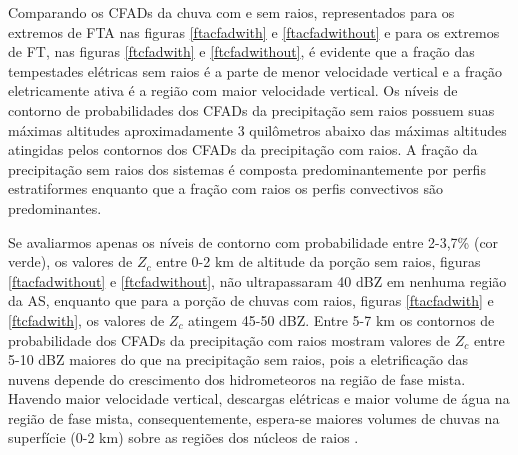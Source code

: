 Comparando os CFADs da chuva com e sem raios, representados para os extremos de FTA nas figuras \ref{ftacfadwith} e \ref{ftacfadwithout} e para os extremos de FT, nas figuras \ref{ftcfadwith} e \ref{ftcfadwithout}, é evidente que a fração das tempestades elétricas sem raios é a parte de menor velocidade vertical e a fração eletricamente ativa é a região com maior velocidade vertical. Os níveis de contorno de probabilidades dos CFADs da precipitação sem raios possuem suas máximas altitudes aproximadamente 3 quilômetros abaixo das máximas altitudes atingidas pelos contornos dos CFADs da precipitação com raios. A fração da precipitação sem raios dos sistemas é composta predominantemente por perfis estratiformes enquanto que a fração com raios  os perfis convectivos são predominantes.




Se avaliarmos apenas os níveis de contorno com probabilidade entre 2-3,7\% (cor verde), os valores de $Z_c$ entre 0-2 km de altitude da porção sem raios, figuras \ref{ftacfadwithout} e \ref{ftcfadwithout}, não ultrapassaram 40 dBZ em nenhuma região da AS, enquanto que para a porção de chuvas com raios, figuras \ref{ftacfadwith} e \ref{ftcfadwith}, os valores de $Z_c$ atingem 45-50 dBZ. Entre 5-7 km os contornos de probabilidade dos CFADs da precipitação com raios mostram valores de $Z_c$ entre 5-10 dBZ maiores do que na precipitação sem raios, pois a eletrificação das nuvens depende do crescimento dos hidrometeoros na região de fase mista. Havendo maior velocidade vertical, descargas elétricas e maior volume de água na região de fase mista, consequentemente, espera-se maiores volumes de chuvas na superfície (0-2 km) sobre as regiões dos núcleos de raios \cite{Petersen1998}. 


